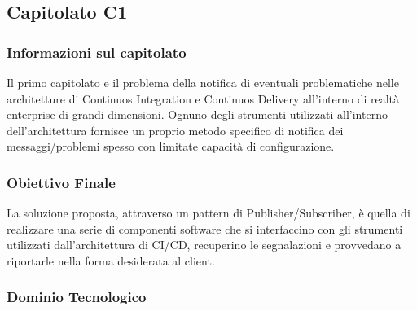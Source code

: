 \subsection{Capitolato C1}

\subsubsection{Informazioni sul capitolato}
Il primo capitolato e il problema della notifica di eventuali problematiche nelle architetture di Continuos Integration e Continuos Delivery all'interno di realtà enterprise di grandi dimensioni. Ognuno degli strumenti utilizzati all'interno dell'architettura fornisce un proprio metodo specifico di notifica dei messaggi/problemi spesso con limitate capacità di configurazione. 
\subsubsection{Obiettivo Finale}
La soluzione proposta, attraverso un pattern di Publisher/Subscriber, è quella di realizzare una serie di componenti software che si interfaccino con gli strumenti utilizzati dall'architettura di CI/CD, recuperino  le segnalazioni e provvedano a riportarle nella forma desiderata al client.  
\subsubsection{Dominio Tecnologico}

